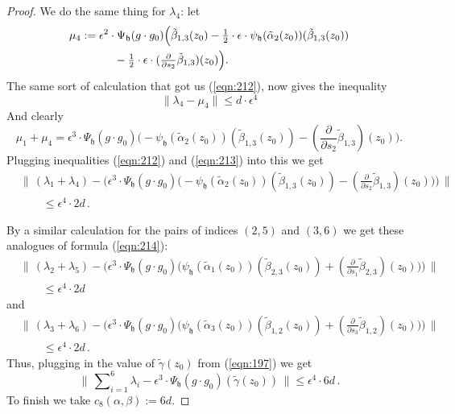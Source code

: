 \documentclass[10pt, a4paper]{amsart}
\theoremstyle{definition}
\numberwithin{equation}{section}
\newcommand{\mfrak}[1]{\mathfrak{#1}}
\newcommand{\smfrac}[2]{{\textstyle \frac{#1}{#2}}}
\newcommand{\bosum}{\sum\nolimits}
\newcommand{\til}[1]{\tilde{#1}}
\newcommand{\norm}[1]{\lVert #1 \rVert}
\newcommand{\Norm}[1]{\bigl\lVert\, #1 \, \bigr\rVert}
\newcommand{\h}{\mfrak{h}}
\begin{document}
\begin{proof}
We do the same thing for $\lambda_4$: let 
\[ \begin{aligned}
& \mu_4 := \epsilon^2 \cdot \Psi_{\h}(g \cdot g_0) \Bigl(
\til{\beta}_{1, 3}(z_0) 
- \smfrac{1}{2} \cdot \epsilon \cdot
\psi_{\h}(\til{\alpha}_2(z_0))(\til{\beta}_{1, 3}(z_0)) \\
& \qquad \qquad  
- \smfrac{1}{2} \cdot \epsilon \cdot 
(\smfrac{\partial}{\partial s_2} \til{\beta}_{1, 3})(z_0) \Bigr) .
\end{aligned} \]
The same sort of calculation that got us (\ref{eqn:212}), now gives the
inequality
\begin{equation} \label{eqn:213}
\norm{ \lambda_4 - \mu_4 } \leq d \cdot \epsilon^4
\end{equation}
And clearly 
\[ \mu_1 + \mu_4 = 
\epsilon^3 \cdot \Psi_{\h}(g \cdot g_0) \bigl( 
- \psi_{\h}(\til{\alpha}_2(z_0))(\til{\beta}_{1, 3}(z_0)) 
- (\smfrac{\partial}{\partial s_2} \til{\beta}_{1, 3})(z_0) \bigr) . \]
Plugging inequalities  (\ref{eqn:212}) and (\ref{eqn:213}) into this 
we get
\begin{equation} \label{eqn:214}
\begin{aligned}
& \Norm{ (\lambda_1 + \lambda_4) - 
\bigl( \epsilon^3 \cdot \Psi_{\h}(g \cdot g_0) \bigl( 
- \psi_{\h}(\til{\alpha}_2(z_0))(\til{\beta}_{1, 3}(z_0)) 
- (\smfrac{\partial}{\partial s_2} \til{\beta}_{1, 3})(z_0) \bigr) \bigr) } \\
& \qquad \leq \epsilon^4 \cdot 2 d \, . 
\end{aligned}
\end{equation}

By a similar calculation for the pairs of indices $(2, 5)$ and $(3, 6)$ 
we get these analogues of formula (\ref{eqn:214}): 
\[ \begin{aligned}
& \Norm{ (\lambda_2 + \lambda_5) - 
\bigl( \epsilon^3 \cdot \Psi_{\h}(g \cdot g_0) \bigl( 
\psi_{\h}(\til{\alpha}_1(z_0))(\til{\beta}_{2, 3}(z_0)) 
+ (\smfrac{\partial}{\partial s_1} \til{\beta}_{2, 3})(z_0) \bigr) \bigr) } \\
& \qquad \leq \epsilon^4 \cdot 2 d  
\end{aligned} \]
and 
\[ \begin{aligned}
& \Norm{ (\lambda_3 + \lambda_6) - 
\bigl( \epsilon^3 \cdot \Psi_{\h}(g \cdot g_0) \bigl( 
\psi_{\h}(\til{\alpha}_3(z_0))(\til{\beta}_{1, 2}(z_0)) 
+ (\smfrac{\partial}{\partial s_3} \til{\beta}_{1, 2})(z_0) \bigr) \bigr) } \\
& \qquad \leq \epsilon^4 \cdot 2 d \, . 
\end{aligned} \]
Thus, plugging in the value of $\til{\gamma}(z_0)$ from (\ref{eqn:197}) we get
\[ \Norm{ \bosum_{i = 1}^6 \lambda_i - 
\epsilon^3 \cdot \Psi_{\h}(g \cdot g_0) (\til{\gamma}(z_0)) }
\leq \epsilon^4 \cdot 6 d \, . \]
To finish we take
$c_8(\alpha, \beta) :=  6 d$.
\end{proof}
\end{document}
